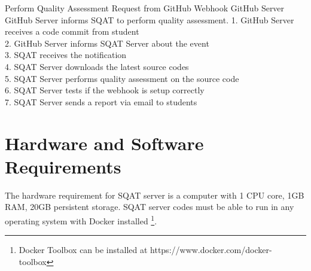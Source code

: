 \usecases
    {Perform Quality Assessment Request from GitHub Webhook}
    {GitHub Server}
    {GitHub Server informs SQAT to perform quality assessment. }
    {
        1. GitHub Server receives a code commit from student\\
        2. GitHub Server informs SQAT Server about the event\\
        3. SQAT receives the notification\\
        4. SQAT Server downloads the latest source codes\\
        5. SQAT Server performs quality assessment on the source code\\
        6. SQAT Server tests if the webhook is setup correctly\\
        7. SQAT Server sends a report via email to students
    }

\section{Hardware and Software Requirements}

The hardware requirement for SQAT server is a computer with 1 CPU core, 1GB RAM, 20GB persistent storage. SQAT server codes must be able to run in any operating system with Docker installed \footnote{Docker Toolbox can be installed at https://www.docker.com/docker-toolbox}. 